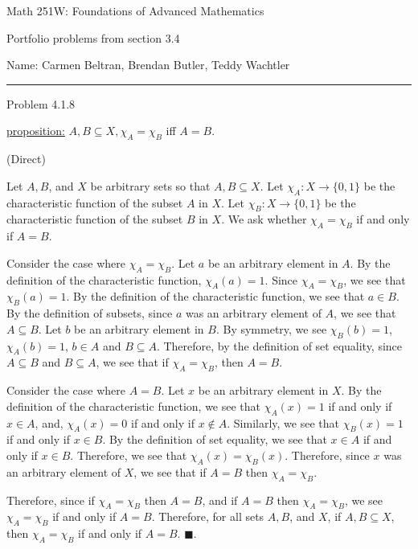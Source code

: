 \documentclass{article}
\theoremstyle{definition}
\renewcommand{\qed}{\blacksquare}
\begin{document}
	\begin{center}
		\Large{Math 251W: Foundations of Advanced Mathematics}

		\normalsize Portfolio problems from section 3.4

		\hfill Name: Carmen Beltran, Brendan Butler, Teddy Wachtler
		\hrule
		\vspace{0.4cm}
		\vspace{0.75cm}
	\end{center}


	\vspace{1cm}
	\noindent Problem 4.1.8
	\vspace{0.3cm}

	\underline{proposition:}
	$A, B\subseteq X, \chi_A = \chi_B$ iff $A = B$.

	\vspace{.2cm}
	 (Direct)
	\vspace{.15cm}

    Let $A, B$, and $X$ be arbitrary sets so that $A, B \subseteq X$.
    Let $\chi_A : X \rightarrow \{0, 1\}$ be the characteristic function of the subset $A$ in $X$.
    Let $\chi_B : X \rightarrow \{0, 1\}$ be the characteristic function of the subset $B$ in $X$.
    We ask whether $\chi_A = \chi_B$ if and only if $A = B$.

    Consider the case where $\chi_A = \chi_B$.
    Let $a$ be an arbitrary element in $A$.
    By the definition of the characteristic function, $\chi_A(a) = 1$.
    Since $\chi_A = \chi_B$, we see that $\chi_B(a) = 1$.
    By the definition of the characteristic function, we see that $a \in B$.
    By the definition of subsets, since $a$ was an arbitrary element of $A$, we see that $A \subseteq B$.
    Let $b$ be an arbitrary element in $B$.
    By symmetry, we see $\chi_B(b) = 1$, $\chi_A(b) = 1$, $b \in A$ and $B \subseteq A$.
    Therefore, by the definition of set equality, since $A \subseteq B$ and $B \subseteq A$, we see that if $\chi_A = \chi_B$, then $A = B$.

    Consider the case where $A = B$.
    Let $x$ be an arbitrary element in $X$.
    By the definition of the characteristic function, we see that $\chi_A(x) = 1$ if and only if $x \in A$, and, $\chi_A(x) = 0$ if and only if $x \not \in A$.
    Similarly, we see that $\chi_B(x) = 1$ if and only if $x \in B$.
    By the definition of set equality, we see that $x \in A$ if and only if $x \in B$.
    Therefore, we see that $\chi_A(x) = \chi_B(x)$.
    Therefore, since $x$ was an arbitrary element of $X$, we see that if $A = B$ then $\chi_A = \chi_B$.

    Therefore, since if $\chi_A = \chi_B$ then $A = B$, and if $A = B$ then $\chi_A = \chi_B$, we see $\chi_A = \chi_B$ if and only if $A = B$.
    Therefore, for all sets $A, B$, and $X$, if $A, B \subseteq X$, then $\chi_A = \chi_B$ if and only if $A = B$. 
	$\qed$.

	\vspace{1cm}

\end{document}
